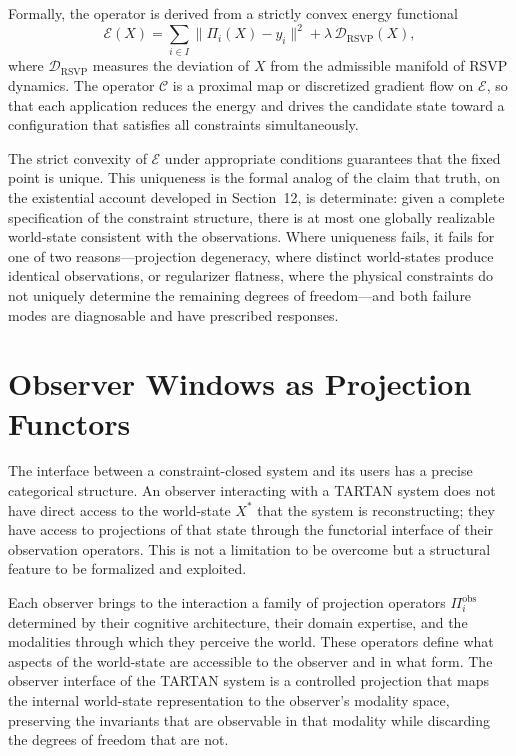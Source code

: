 \documentclass[11pt, oneside]{article}
\begin{document}
Formally, the operator is derived from a strictly convex energy functional
\[
\mathcal{E}(X) = \sum_{i \in I} \|\Pi_i(X) - y_i\|^2 + \lambda \, \mathcal{D}_{\mathrm{RSVP}}(X),
\]
where $\mathcal{D}_{\mathrm{RSVP}}$ measures the deviation of $X$ from the admissible manifold of RSVP dynamics. The operator $\mathcal{C}$ is a proximal map or discretized gradient flow on $\mathcal{E}$, so that each application reduces the energy and drives the candidate state toward a configuration that satisfies all constraints simultaneously.

The strict convexity of $\mathcal{E}$ under appropriate conditions guarantees that the fixed point is unique. This uniqueness is the formal analog of the claim that truth, on the existential account developed in Section~12, is determinate: given a complete specification of the constraint structure, there is at most one globally realizable world-state consistent with the observations. Where uniqueness fails, it fails for one of two reasons---projection degeneracy, where distinct world-states produce identical observations, or regularizer flatness, where the physical constraints do not uniquely determine the remaining degrees of freedom---and both failure modes are diagnosable and have prescribed responses.

\section{Observer Windows as Projection Functors}

The interface between a constraint-closed system and its users has a precise categorical structure. An observer interacting with a TARTAN system does not have direct access to the world-state $X^\ast$ that the system is reconstructing; they have access to projections of that state through the functorial interface of their observation operators. This is not a limitation to be overcome but a structural feature to be formalized and exploited.

Each observer brings to the interaction a family of projection operators $\Pi_i^{\mathrm{obs}}$ determined by their cognitive architecture, their domain expertise, and the modalities through which they perceive the world. These operators define what aspects of the world-state are accessible to the observer and in what form. The observer interface of the TARTAN system is a controlled projection that maps the internal world-state representation to the observer's modality space, preserving the invariants that are observable in that modality while discarding the degrees of freedom that are not.
\end{document}
